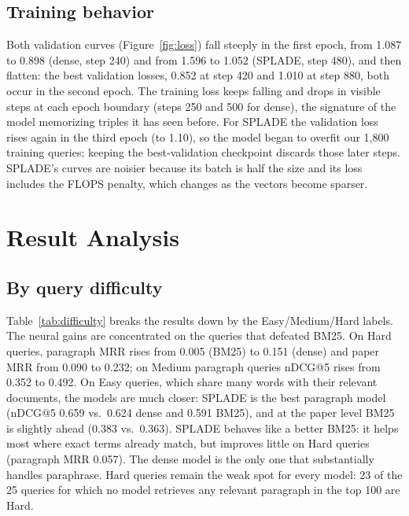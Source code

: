 \documentclass[sigconf,nonacm]{acmart}
\begin{document}
\subsection{Training behavior}
Both validation curves (Figure~\ref{fig:loss}) fall steeply in the first epoch, from 1.087 to 0.898 (dense, step 240) and from 1.596 to 1.052 (SPLADE, step 480), and then flatten: the best validation losses, 0.852 at step 420 and 1.010 at step 880, both occur in the second epoch. The training loss keeps falling and drops in visible steps at each epoch boundary (steps 250 and 500 for dense), the signature of the model memorizing triples it has seen before. For SPLADE the validation loss rises again in the third epoch (to 1.10), so the model began to overfit our 1{,}800 training queries; keeping the best-validation checkpoint discards those later steps. SPLADE's curves are noisier because its batch is half the size and its loss includes the FLOPS penalty, which changes as the vectors become sparser.

\section{Result Analysis}
\subsection{By query difficulty}
Table~\ref{tab:difficulty} breaks the results down by the Easy/Medium/Hard labels. The neural gains are concentrated on the queries that defeated BM25. On Hard queries, paragraph MRR rises from 0.005 (BM25) to 0.151 (dense) and paper MRR from 0.090 to 0.232; on Medium paragraph queries nDCG@5 rises from 0.352 to 0.492. On Easy queries, which share many words with their relevant documents, the models are much closer: SPLADE is the best paragraph model (nDCG@5 0.659 vs.\ 0.624 dense and 0.591 BM25), and at the paper level BM25 is slightly ahead (0.383 vs.\ 0.363). SPLADE behaves like a better BM25: it helps most where exact terms already match, but improves little on Hard queries (paragraph MRR 0.057). The dense model is the only one that substantially handles paraphrase. Hard queries remain the weak spot for every model: 23 of the 25 queries for which no model retrieves any relevant paragraph in the top 100 are Hard.
\end{document}
